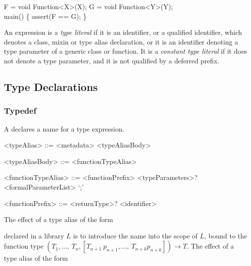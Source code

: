\documentclass[makeidx]{article}
\begin{document}
{\begin{dartCode}
\TYPEDEF{} F = void Function<X>(X);
\TYPEDEF{} G = void Function<Y>(Y);
\\
\VOID{} main() \{
  assert(F == G);
\}
\end{dartCode}

\LMHash{}

\LMHash{}
An expression is a \emph{type literal} if it is an identifier,
or a qualified identifier,
which denotes a class, mixin or type alias declaration, or it is
an identifier denoting a type parameter of a generic class or function.
It is a \emph{constant type literal} if it does not denote a type parameter,
and it is not qualified by a deferred prefix.

\subsection{Type Declarations}


\subsubsection{Typedef}

\LMHash{}%
A  declares a name for a type expression.

\begin{grammar}
<typeAlias> ::= <metadata> \TYPEDEF{} <typeAliasBody>

<typeAliasBody> ::= <functionTypeAlias>

<functionTypeAlias> ::= \gnewline{}
  <functionPrefix> <typeParameters>? <formalParameterList> `;'

<functionPrefix> ::= <returnType>? <identifier>
\end{grammar}


\LMHash{}%
The effect of a type alias of the form


\noindent
declared in a library $L$ is to introduce the name \id{} into the scope of $L$, bound to the function type
$(T_1, \ldots,\ T_n, [T_{n+1}\ p_{n+1}, \ldots,\ T_{n+k} p_{n+k}]) \rightarrow T$.
The effect of a type alias of the form

}
\end{document}
